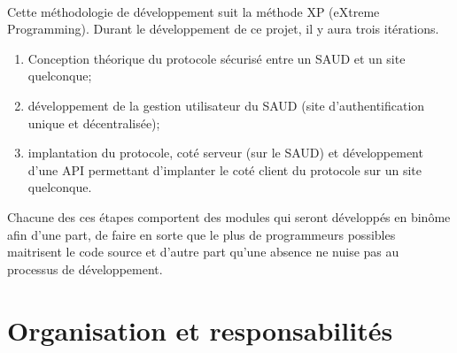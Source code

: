 \documentclass[a4paper,11pt,french]{article}
\begin{document}
\paragraph{}
Cette méthodologie de développement suit la méthode XP (eXtreme Programming). 
Durant le développement de ce projet, il y aura trois itérations.
\begin{enumerate}
 \item Conception théorique du protocole sécurisé entre un SAUD et un site 
quelconque;
 \item développement de la gestion utilisateur du SAUD (site
d'authentification unique et décentralisée);
 \item implantation du protocole, coté serveur (sur le SAUD) et développement 
d'une API permettant d'implanter le coté client du protocole sur un site
quelconque. 
\end{enumerate}
Chacune des ces étapes comportent des modules qui seront développés en binôme
afin d'une part, de faire en sorte que le plus de programmeurs possibles
maitrisent le code source et d'autre part qu'une absence ne nuise pas au
processus de développement.

\section{Organisation et responsabilités}
\end{document}
